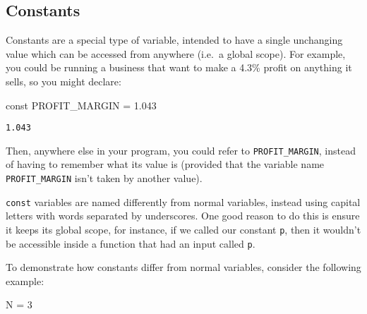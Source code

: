 \documentclass[
  letterpaper,
  DIV=11,
  numbers=noendperiod]{scrreprt}
\newenvironment{Shaded}{\begin{snugshade}}{\end{snugshade}}
\newcommand{\FloatTok}[1]{\textcolor[rgb]{0.68,0.00,0.00}{#1}}
\newcommand{\KeywordTok}[1]{\textcolor[rgb]{0.00,0.23,0.31}{#1}}
\newcommand{\NormalTok}[1]{\textcolor[rgb]{0.00,0.23,0.31}{#1}}
\newcommand{\OperatorTok}[1]{\textcolor[rgb]{0.37,0.37,0.37}{#1}}
\begin{document}
\hypertarget{constants}{%
\subsection{Constants}\label{constants}}

Constants are a special type of variable, intended to have a single
unchanging value which can be accessed from anywhere (i.e.~a global
scope). For example, you could be running a business that want to make a
4.3\% profit on anything it sells, so you might declare:

\begin{Shaded}
\begin{Highlighting}[]
\KeywordTok{const}\NormalTok{ PROFIT\_MARGIN }\OperatorTok{=} \FloatTok{1.043}
\end{Highlighting}
\end{Shaded}

\begin{verbatim}
1.043
\end{verbatim}

Then, anywhere else in your program, you could refer to
\texttt{PROFIT\_MARGIN}, instead of having to remember what its value is
(provided that the variable name \texttt{PROFIT\_MARGIN} isn't taken by
another value).

\begin{tcolorbox}[enhanced jigsaw, toprule=.15mm, opacitybacktitle=0.6, leftrule=.75mm, breakable, coltitle=black, bottomrule=.15mm, colbacktitle=quarto-callout-tip-color!10!white, bottomtitle=1mm, rightrule=.15mm, title=\textcolor{quarto-callout-tip-color}{\faLightbulb}\hspace{0.5em}{Convention}, colframe=quarto-callout-tip-color-frame, left=2mm, colback=white, opacityback=0, arc=.35mm, toptitle=1mm, titlerule=0mm]

\texttt{const} variables are named differently from normal variables,
instead using capital letters with words separated by underscores. One
good reason to do this is ensure it keeps its global scope, for
instance, if we called our constant \texttt{p}, then it wouldn't be
accessible inside a function that had an input called \texttt{p}.

\end{tcolorbox}

To demonstrate how constants differ from normal variables, consider the
following example:

\begin{Shaded}
\begin{Highlighting}[]
\NormalTok{N }\OperatorTok{=} \FloatTok{3}
\end{Highlighting}
\end{Shaded}
\end{document}
